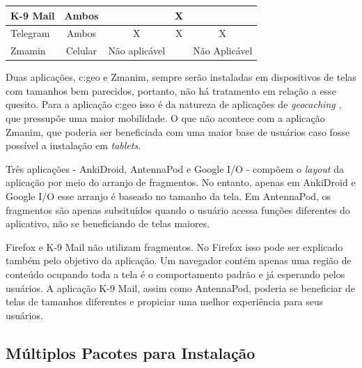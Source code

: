\begin{table}[ht]
\begin{tabular}{|l|c|c|c|c|}
K-9 Mail           & Ambos                                                             &                                                                           & X                                                                         &                                                                          \\ \hline
Telegram           & Ambos                                                             & X                                                                         & X                                                                         & X                                                                        \\ \hline
Zmamin             & Celular                                                           & Não aplicável                                                             &                                                                           & Não Aplicável                                                            \\ \hline
\end{tabular}
\end{table}

Duas aplicações, c:geo e Zmanim, sempre serão instaladas em dispositivos de telas
com tamanhos bem parecidos, portanto, não há tratamento em relação a esse quesito.
Para a aplicação c:geo isso é da natureza de  aplicações de \textit{geocaching} \cite{Ohara2008},
que pressupõe uma maior mobilidade. O que não acontece com a aplicação Zmanim,
que poderia ser beneficiada com uma maior base de usuários caso fosse possível
a instalação em \textit{tablets}.

Três aplicações - AnkiDroid, AntennaPod e Google I/O -  compõem o \textit{layout}
da aplicação por meio do arranjo de fragmentos. No entanto, apenas em AnkiDroid
e Google I/O esse arranjo é baseado no tamanho da tela. Em AntennaPod, os
fragmentos são apenas subsituídos quando o usuário acessa funções diferentes do
aplicativo, não se beneficiando de telas maiores.

Firefox e K-9 Mail não utilizam fragmentos. No Firefox isso pode ser explicado
também pelo objetivo da aplicação. Um navegador contém apenas uma região de
conteúdo ocupando toda a tela é o comportamento padrão e já esperando pelos
usuários. A aplicação K-9 Mail, assim como AntennaPod, poderia se beneficiar de
telas de tamanhos diferentes e propiciar uma melhor experiência para seus usuários.

\subsection{Múltiplos Pacotes para Instalação}
\label{sec:multiplos_pacotes}


